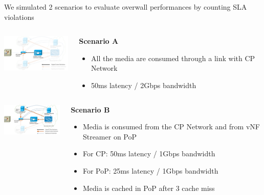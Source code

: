 \documentclass[a4paper]{beamer}
\begin{document}
\begin{frame}{We simulated 2 scenarios to evaluate overwall performances by counting SLA violations}
	

		\begin{columns}[T]
		\begin{column}[T]{0.33 \textwidth} 
			
			\includegraphics[width=10em]{highleveldesign1.png}
		\end{column}
										
		\begin{column}[T]{0.66\textwidth} 
										  
			\textbf{Scenario A}
			\begin{itemize}
				\item All the media are consumed through a link with CP Network
				\item 50ms latency / 2Gbps bandwidth
			\end{itemize}
			\vspace{3mm}
			
		\end{column}
																										
	\end{columns}
	
		\begin{columns}[T]
		\begin{column}[T]{0.33 \textwidth} 
		\vspace{2em}
			\includegraphics[width=10em]{highleveldesign7bis.png}
		\end{column}
										
		\begin{column}[T]{0.66\textwidth} 
										  
			\textbf{Scenario B}
			\begin{itemize}
				\item Media is consumed from the CP Network and from vNF Streamer on PoP
				\item For CP: 50ms latency / 1Gbps bandwidth
				\item For PoP: 25ms latency / 1Gbps bandwidth
				\item Media is cached in PoP after 3 cache miss
			\end{itemize}
			
		\end{column}
																										
	\end{columns}
	
	
	
\end{frame}
\end{document}
